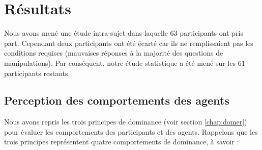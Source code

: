	\section{Résultats}
	\label{sec:res}
	Nous avons mené une étude intra-sujet dans laquelle 63 participants ont pris part. Cependant deux participants ont été écarté car ils ne remplissaient pas les conditions requises (mauvaises réponses à la majorité des questions de manipulations). Par conséquent, notre étude statistique a été mené sur les 61 participants restants. 
	
	
	\subsection{Perception des comportements des agents}
	
	Nous avons repris les trois principes de dominance (voir section \ref{chap:domer}) pour évaluer les comportements des participants et des agents. 
	Rappelons que les trois principes représentent quatre comportements de dominance, à savoir :
	
